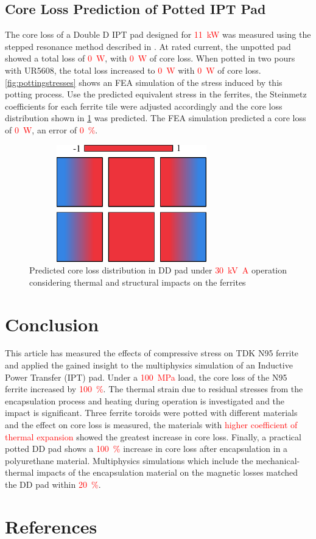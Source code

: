 \documentclass[conference]{IEEEtran}
\begin{document}
\subsection{Core Loss Prediction of Potted IPT Pad}
The core loss of a Double D IPT pad designed for \textcolor{red}{\SI{11}{\kilo\watt}} was measured using the stepped resonance method described in \cite{kalraPowerLossMeasurement2020}.
At rated current, the unpotted pad showed a total loss of \textcolor{red}{\SI{0}{\watt}}, with \textcolor{red}{\SI{0}{\watt}} of core loss.
When potted in two pours with UR5608, the total loss increased to \textcolor{red}{\SI{0}{\watt}} with \textcolor{red}{\SI{0}{\watt}} of core loss. 
\cref{fig:pottingstresses} shows an FEA simulation of the stress induced by this potting process. 
Use the predicted equivalent stress in the ferrites, the Steinmetz coefficients for each ferrite tile were adjusted accordingly and the core loss distribution shown in \cref{fig:padcoreloss} was predicted. 
The FEA simulation predicted a core loss of \textcolor{red}{\SI{0}{\watt}}, an error of \textcolor{red}{\SI{0}{\percent}}. 
\begin{figure}[t]
  \includegraphics[width=3.5in, height=2in]{figures/simulatedpottingpadstresses.pdf}
  \caption{Predicted core loss distribution in DD pad under \textcolor{red}{\SI{30}{\kilo\volt\ampere}} operation considering thermal and structural impacts on the ferrites}
  \label{fig:padcoreloss}
\end{figure}

\section{Conclusion}

This article has measured the effects of compressive stress on TDK N95 ferrite and applied the gained insight to the multiphysics simulation of an Inductive Power Transfer (IPT) pad. 
Under a \textcolor{red}{\SI{100}{\mega\pascal}} load, the core loss of the N95 ferrite increased by \textcolor{red}{\SI{100}{\percent}}. 
The thermal strain due to residual stresses from the encapsulation process and heating during operation is investigated and the impact is significant. 
Three ferrite toroids were potted with different materials and the effect on core loss is measured, the materials with \textcolor{red}{higher coefficient of thermal expansion} showed the greatest increase in core loss. 
Finally, a practical potted DD pad shows a \textcolor{red}{\SI{100}{\percent}} increase in core loss after encapsulation in a polyurethane material. 
Multiphysics simulations which include the mechanical-thermal impacts of the encapsulation material on the magnetic losses matched the DD pad within \textcolor{red}{\SI{20}{\percent}}. 

\section*{References}
\printbibliography[heading=none]
\end{document}

